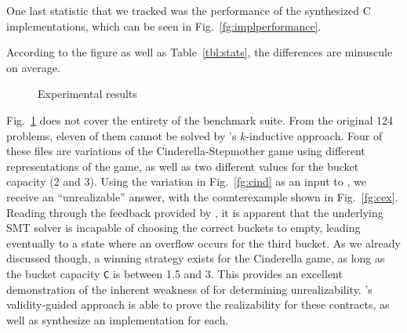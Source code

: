 One last statistic that we tracked was the performance of the synthesized C
implementations, which can be seen in Fig.~\ref{fg:implperformance}.
 \iffalse
  For this purpose, we translated the
 generated witnesses from \jsyn and \jsynvg solutions using
 \smtlibtoc under the same set of options.
 \fi
 According to the figure as well as Table~\ref{tbl:stats}, the differences are minuscule on average.
\iffalse
while \jsyn implementations are faster, the difference is minuscule on average.
This small difference may occur due to the fact that \jsyn creates separate skolem functions for the initial evaluation
(when \%init is true)

and subsequent evaluations, whereas currently \jsynvg uses a single function for both cases, and as such requires the evaluation of richer expressions prior to choosing a proper reaction.
\fi


\begin{figure}[!t]
\centering
{}
\quad
{}
\quad
{}
\caption{Experimental results}
\vspace{-5pt}
\label{fg:results}
\end{figure}


Fig.~\ref{fg:results} does not cover the entirety of the
benchmark suite. From the original 124 problems, eleven of them cannot be
solved by \jsyn's $k$-inductive approach.
Four of these files are variations of
the Cinderella-Stepmother game using different representations of the game, as well as two different values
for the bucket capacity (2 and 3). Using the variation in Fig.~\ref{fg:cind} as an input to \jsyn, we receive an ``unrealizable'' answer, with the counterexample shown
in Fig.~\ref{fg:cex}. Reading through the feedback provided by \jsyn, it is
apparent that the underlying SMT solver is incapable of choosing the correct
buckets to empty, leading eventually to a state where an overflow occurs for the
third bucket. As we already discussed though, a winning strategy exists for the
Cinderella game, as long as the bucket capacity \texttt{C} is between 1.5 and 3. This
provides an excellent demonstration of the inherent weakness of \jsyn
for determining unrealizability. \jsynvg's validity-guided approach
is able to prove the realizability for these contracts, as
well as synthesize an implementation for each.

